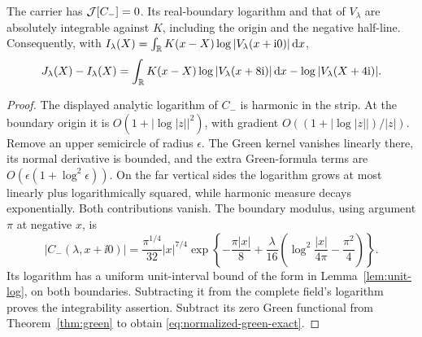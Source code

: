\begin{lemma}\label{lem:carrier-harmonic}
The carrier has \(\mathcal J[C_-]=0\). Its real-boundary logarithm and that
of \(V_\lambda\) are absolutely integrable against \(K\), including
the origin and the negative half-line. Consequently, with
\(I_\lambda(X)=\int_\mathbb R K(x-X)\log|V_\lambda(x+\mathrm i0)|\,\mathrm d x\),
\begin{equation}\label{eq:normalized-green-exact}
 J_\lambda(X)-I_\lambda(X)
 =\int_\mathbb R K(x-X)\log|V_\lambda(x+8\mathrm i)|\,\mathrm d x
       -\log|V_\lambda(X+4\mathrm i)|.
\end{equation}
\end{lemma}
\begin{proof}
The displayed analytic logarithm of \(C_-\) is harmonic in the strip.
At the boundary origin it is \(O(1+|\log|z||^2)\), with gradient
\(O((1+|\log|z||)/|z|)\). Remove an upper semicircle of radius
\(\epsilon\). The Green kernel vanishes linearly there, its normal
derivative is bounded, and the extra Green-formula terms are
\(O(\epsilon(1+\log^2\epsilon))\). On the far vertical sides the
logarithm grows at most linearly plus logarithmically squared, while
harmonic measure decays exponentially. Both contributions vanish.
The boundary modulus, using argument \(\pi\) at negative \(x\), is
\[
 |C_-(\lambda,x+\ii0)|=\frac{\pi^{1/4}}{32}|x|^{7/4}
 \exp\left\{-\frac{\pi|x|}{8}
   +\frac{\lambda}{16}\left(\log^2\frac{|x|}{4\pi}-\frac{\pi^2}{4}\right)\right\}.
\]
Its logarithm has a uniform unit-interval bound of the form in
Lemma~\ref{lem:unit-log}, on both boundaries. Subtracting it from the
complete field's logarithm proves the integrability assertion. Subtract
its zero Green functional from Theorem~\ref{thm:green} to obtain
\eqref{eq:normalized-green-exact}.
\end{proof}

